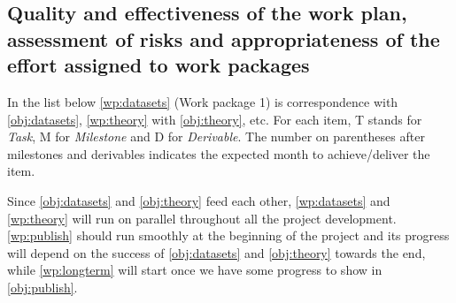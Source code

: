 
\subsection{Quality and effectiveness of the work plan, assessment of risks and appropriateness of the effort assigned to work packages}
\label{sec:implementationworkplan}

In the list below \cref{wp:datasets} (Work package 1) is correspondence with \cref{obj:datasets}, \cref{wp:theory} with \cref{obj:theory}, etc. For each item, T stands for \emph{Task}, M for \emph{Milestone} and D for \emph{Derivable}. The number on parentheses after milestones and derivables indicates the expected month to achieve/deliver the item.

Since \cref{obj:datasets} and \cref{obj:theory} feed each other, \cref{wp:datasets} and \cref{wp:theory} will run on parallel throughout all the project development. \cref{wp:publish} should run smoothly at the beginning of the project and its progress will depend on the success of \cref{obj:datasets} and \cref{obj:theory} towards the end, while \cref{wp:longterm} will start once  we have some progress to show in \cref{obj:publish}.

